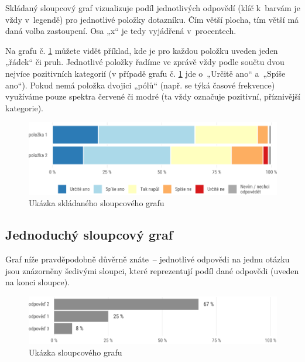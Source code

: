 \documentclass[12pt,a4paper,]{report}
\begin{document}
Skládaný sloupcový graf vizualizuje podíl jednotlivých odpovědí (klíč k~barvám je vždy v~legendě) pro jednotlivé položky dotazníku. Čím větší plocha, tím větší má daná volba zastoupení. Osa „x`` je tedy vyjádřená v~procentech.

Na grafu č. \ref{fig:stackedBarPlot} můžete vidět příklad, kde je pro každou položku uveden jeden „řádek`` či pruh. Jednotlivé položky řadíme ve zprávě vždy podle součtu dvou nejvíce pozitivních kategorií (v případě grafu č. \ref{fig:stackedBarPlot} jde o~„Určitě ano`` a~„Spíše ano``). Pokud nemá položka dvojici „pólů`` (např. se týká časové frekvence) využíváme pouze spektra červené či modré (ta vždy označuje pozitivní, příznivější kategorie).

\begin{figure}

{\centering \includegraphics[width=\textwidth]{figs/stackedBarPlot-1} 

}

\caption{Ukázka skládaného sloupcového grafu}\label{fig:stackedBarPlot}
\end{figure}

\hypertarget{jednoduchuxfd-sloupcovuxfd-graf}{%
\subsection{Jednoduchý sloupcový graf}\label{jednoduchuxfd-sloupcovuxfd-graf}}

Graf níže pravděpodobně důvěrně znáte~-- jednotlivé odpovědi na jednu otázku jsou znázorněny šedivými sloupci, které reprezentují podíl dané odpovědi (uveden na konci sloupce).

\begin{figure}

{\centering \includegraphics[width=\textwidth]{figs/unnamed-chunk-1-1} 

}

\caption{Ukázka sloupcového grafu}\label{fig:unnamed-chunk-1}
\end{figure}
\end{document}
